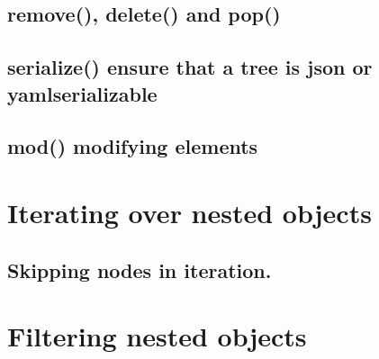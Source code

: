 \documentclass[a4paper,10pt,english]{sphinxmanual}
\begin{document}
\subsection{remove(), delete() and pop()}
\label{\detokenize{README:remove-delete-and-pop}}

\subsection{serialize() \textendash{} ensure that a tree is json\sphinxhyphen{} or yaml\sphinxhyphen{}serializable}
\label{\detokenize{README:serialize-ensure-that-a-tree-is-json-or-yaml-serializable}}

\subsection{mod() \textendash{} modifying elements}
\label{\detokenize{README:mod-modifying-elements}}

\section{Iterating over nested objects}
\label{\detokenize{README:iterating-over-nested-objects}}

\subsection{Skipping nodes in iteration.}
\label{\detokenize{README:skipping-nodes-in-iteration}}

\section{Filtering nested objects}
\label{\detokenize{README:filtering-nested-objects}}
\sphinxstepscope
\end{document}
